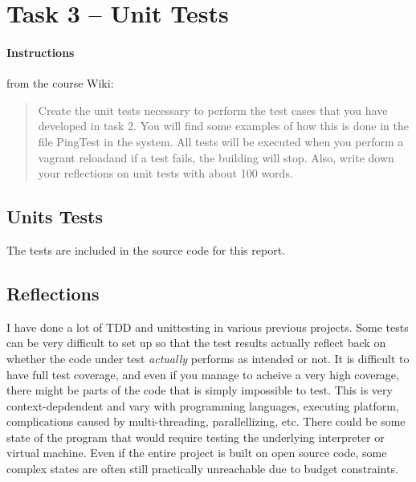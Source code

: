 %
%
%
%


\section{Task 3 -- Unit Tests}

\paragraph{Instructions}\label{task-1-instructions}
from the course Wiki\cite{1dv600:lab3:instructions}:

\begin{quote}
    Create the unit tests necessary to perform the test cases that you have
    developed in task 2. You will find some examples of how this is done in the
    file PingTest in the system. All tests will be executed when you perform a
    vagrant reloadand if a test fails, the building will stop. Also, write down
    your reflections on unit tests with about 100 words.
\end{quote}



\subsection{Units Tests}\label{task-2a}
The tests are included in the source code for this report.


\subsection{Reflections}\label{task-3-reflect}
I have done a lot of TDD and unittesting in various previous projects.  Some
tests can be very difficult to set up so that the test results actually reflect
back on whether the code under test \emph{actually} performs as intended or
not. It is difficult to have full test coverage\cite{wiki:code-coverage}, and
even if you manage to acheive a very high coverage, there might be parts of the
code that is simply impossible to test. This is very context-depdendent and
vary with programming languages, executing platform, complications caused by
multi-threading, parallellizing, etc. There could be some state of the program
that would require testing the underlying interpreter or virtual machine. Even
if the entire project is built on open source code, some complex states are
often still practically unreachable due to budget constraints.


